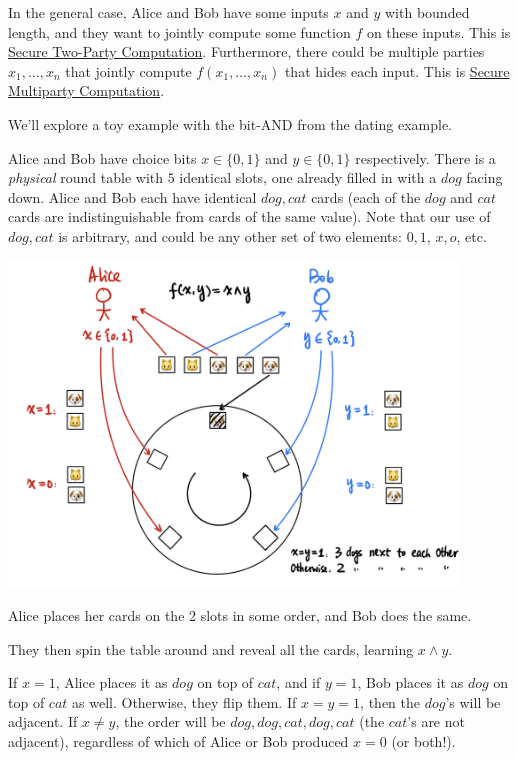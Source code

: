 In the general case, Alice and Bob have some inputs $x$ and $y$ with bounded length, and they want to jointly compute some function $f$ on these inputs. This is \ul{Secure Two-Party Computation}. Furthermore, there could be multiple parties $x_1, \dots, x_n$ that jointly compute $f(x_1, \dots, x_n)$ that hides each input. This is \ul{Secure Multiparty Computation}.

We'll explore a toy example with the bit-\textsf{AND} from the dating example.

\begin{example*}
    Alice and Bob have choice bits $x\in\{0, 1\}$ and $y\in\{0, 1\}$ respectively. There is a \emph{physical} round table with $5$ identical slots, one already filled in with a $dog$ facing down. Alice and Bob each have identical $dog, cat$ cards (each of the $dog$ and $cat$ cards are indistinguishable from cards of the same value). Note that our use of $dog, cat$ is arbitrary, and could be any other set of two elements: $0, 1$, $x, o$, etc.

    \begin{center}
        \includegraphics[width=0.9\textwidth]{images/2025/private_dating.png}
    \end{center}

    Alice places her cards on the 2 slots in some order, and Bob does the same.

    They then spin the table around and reveal all the cards, learning $x\land y$.

    If $x = 1$, Alice places it as $dog$ on top of $cat$, and if $y = 1$, Bob places it as $dog$ on top of $cat$ as well. Otherwise, they flip them. If $x = y = 1$, then the $dog$'s will be adjacent. If $x \neq y$, the order will be $dog,dog,cat,dog,cat$ (the $cat$'s are not adjacent), regardless of which of Alice or Bob produced $x = 0$ (or both!).
\end{example*}

